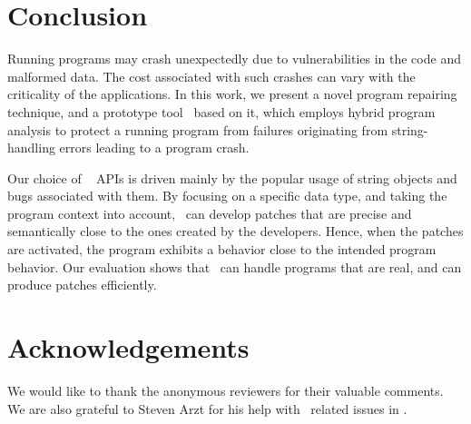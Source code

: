 \section{Conclusion}%
\label{sec:conc}

Running programs may crash unexpectedly due to vulnerabilities in the code and
malformed data. The cost associated with such crashes can vary with the
criticality of the applications.
In this work, we present a novel program repairing technique, and a
prototype tool \tool\ based on it, which employs hybrid program analysis to
protect a running program from failures originating from string-handling errors
leading to a program crash.

Our choice of \java\  APIs is driven mainly by the popular usage of
string objects and bugs associated with them. By focusing on a specific data
type, and taking the program context into account, \tool\ can develop patches
that are precise and semantically close to the ones created by the developers.
Hence, when the patches are activated, the program exhibits a behavior close to
the intended program behavior.
Our evaluation shows that \tool\ can handle programs that are real, and can
produce patches efficiently.

\section{Acknowledgements}
\label{sec:acks}

We would like to thank the anonymous reviewers for their valuable comments. We
are also grateful to Steven Arzt for his help with \soot\ related issues in
\tool.
